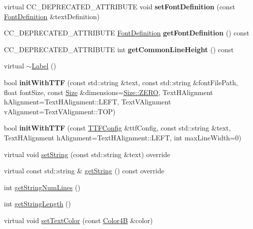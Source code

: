 \begin{DoxyCompactItemize}
virtual C\+C\+\_\+\+D\+E\+P\+R\+E\+C\+A\+T\+E\+D\+\_\+\+A\+T\+T\+R\+I\+B\+U\+TE void {\bfseries set\+Font\+Definition} (const \hyperlink{structFontDefinition}{Font\+Definition} \&text\+Definition)
\item 
\mbox{\label{classLabel_ab930ea670d32eb899575de588a81ab45}} 
C\+C\+\_\+\+D\+E\+P\+R\+E\+C\+A\+T\+E\+D\+\_\+\+A\+T\+T\+R\+I\+B\+U\+TE \hyperlink{structFontDefinition}{Font\+Definition} {\bfseries get\+Font\+Definition} () const
\item 
\mbox{\label{classLabel_a69eb7a73d9f1db0d8c8080044715addc}} 
C\+C\+\_\+\+D\+E\+P\+R\+E\+C\+A\+T\+E\+D\+\_\+\+A\+T\+T\+R\+I\+B\+U\+TE int {\bfseries get\+Common\+Line\+Height} () const
\item 
virtual \hyperlink{classLabel_a39e1167a9b5827afd888780973d88894}{$\sim$\+Label} ()
\item 
\mbox{\label{classLabel_a09c434396714e27ef66bccf6cbd24b4d}} 
bool {\bfseries init\+With\+T\+TF} (const std\+::string \&text, const std\+::string \&font\+File\+Path, float font\+Size, const \hyperlink{classSize}{Size} \&dimensions=\hyperlink{classSize_a724334f12c8ef877c36b3f69e1257aa7}{Size\+::\+Z\+E\+RO}, Text\+H\+Alignment h\+Alignment=Text\+H\+Alignment\+::\+L\+E\+FT, Text\+V\+Alignment v\+Alignment=Text\+V\+Alignment\+::\+T\+OP)
\item 
\mbox{\label{classLabel_acc508cd3591ebac04f7170333a537f14}} 
bool {\bfseries init\+With\+T\+TF} (const \hyperlink{structTTFConfig}{T\+T\+F\+Config} \&ttf\+Config, const std\+::string \&text, Text\+H\+Alignment h\+Alignment=Text\+H\+Alignment\+::\+L\+E\+FT, int max\+Line\+Width=0)
\item 
virtual void \hyperlink{classLabel_a1fcc854cb77c84193507e085e761a298}{set\+String} (const std\+::string \&text) override
\item 
virtual const std\+::string \& \hyperlink{classLabel_ab306634d58f4317fd96008a5ee67a7a7}{get\+String} () const override
\item 
int \hyperlink{classLabel_ab412a9bf4034e5ac27293fe9b44b654a}{get\+String\+Num\+Lines} ()
\item 
int \hyperlink{classLabel_ae21ab9e381ac4c9589c31401843e5ca2}{get\+String\+Length} ()
\item 
virtual void \hyperlink{classLabel_a80fd59b2bd8674240bb1c2dac7144ee0}{set\+Text\+Color} (const \hyperlink{structColor4B}{Color4B} \&color)

\end{DoxyCompactItemize}
